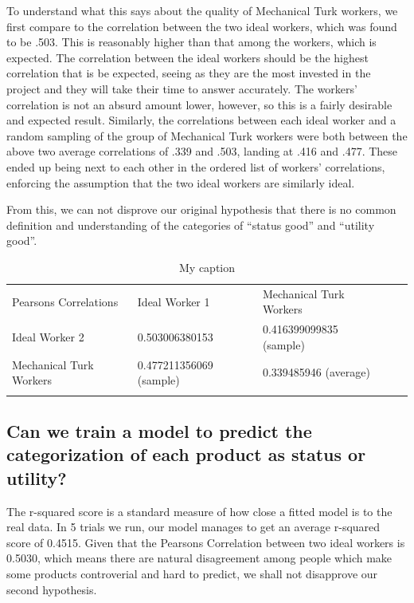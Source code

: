 \documentclass[dvips,12pt]{article}
\begin{document}
To understand what this says about the quality of Mechanical Turk workers, we first compare to the correlation between the two ideal workers, which was found to be .503. This is reasonably higher than that among the workers, which is expected. The correlation between the ideal workers should be the highest correlation that is be expected, seeing as they are the most invested in the project and they will take their time to answer accurately. The workers’ correlation is not an absurd amount lower, however, so this is a fairly desirable and expected result. Similarly, the correlations between each ideal worker and a random sampling of the group of Mechanical Turk workers were both between the above two average correlations of .339 and .503, landing at .416 and .477. These ended up being next to each other in the ordered list of workers’ correlations, enforcing the assumption that the two ideal workers are similarly ideal. 

From this, we can not disprove our original hypothesis that there is no common definition and understanding of the categories of “status good” and “utility good”.

\begin{table}[]
	\centering
	\caption{My caption}
	\label{my-label}
	\begin{tabular}{lllll}
		\cline{1-3}
		\multicolumn{1}{|l|}{Pearsons Correlations}   & \multicolumn{1}{l|}{Ideal Worker 1}          & \multicolumn{1}{l|}{Mechanical Turk Workers} &  &  \\ \cline{1-3}
		\multicolumn{1}{|l|}{Ideal Worker 2}          & \multicolumn{1}{l|}{0.503006380153}          & \multicolumn{1}{l|}{0.416399099835 (sample)} &  &  \\ \cline{1-3}
		\multicolumn{1}{|l|}{Mechanical Turk Workers} & \multicolumn{1}{l|}{0.477211356069 (sample)} & \multicolumn{1}{l|}{0.339485946 (average)}   &  &  \\ \cline{1-3}
		&                                              &                                              &  & 
	\end{tabular}
\end{table}

\subsection{Can we train a model to predict the categorization of each product as status or utility? }

The r-squared score is a standard measure of how close a fitted model is to the real data. In 5 trials we run, our model manages to get an average r-squared score of 0.4515. Given that the Pearsons Correlation between two ideal workers is 0.5030, which means there are natural disagreement among people which make some products controverial and hard to predict, we shall not disapprove our second hypothesis.
\end{document}
